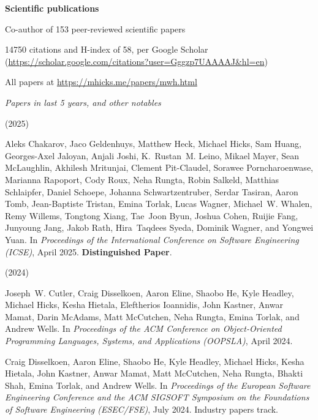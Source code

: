 \documentclass[11pt]{article}
\begin{document}
\begin{description}
\setlength{\labelsep}{0ex}
\setlength{\itemsep}{-0.5ex}


\item {\bf\textsf Scientific publications}

\item Co-author of 153 peer-reviewed scientific papers
\item 14750 citations and H-index of 58, per Google Scholar\\
  (\url{https://scholar.google.com/citations?user=Gggzp7UAAAAJ&hl=en})
 \item All papers at \url{https://mhicks.me/papers/mwh.html}

\item
\item {\it\textsf Papers in last 5 years, and other notables}
\item (2025)

\item
Aleks Chakarov, Jaco Geldenhuys, Matthew Heck, Michael Hicks, Sam Huang,
  Georges-Axel Jaloyan, Anjali Joshi, K.~Rustan~M. Leino, Mikael Mayer, Sean
  McLaughlin, Akhilesh Mritunjai, Clement Pit-Claudel, Sorawee Porncharoenwase,
  Marianna Rapoport, Cody Roux, Neha Rungta, Robin Salkeld, Matthias
  Schlaipfer, Daniel Schoepe, Johanna Schwartzentruber, Serdar Tasiran, Aaron
  Tomb, Jean-Baptiste Tristan, Emina Torlak, Lucas Wagner, Michael~W. Whalen,
  Remy Willems, Tongtong Xiang, Tae~Joon Byun, Joshua Cohen, Ruijie Fang,
  Junyoung Jang, Jakob Rath, Hira~Taqdees Syeda, Dominik Wagner, and Yongwei
  Yuan.
In {\em Proceedings of the International Conference on Software
  Engineering (ICSE)}, April 2025. \textbf{Distinguished Paper}.

\item
\item (2024)

\item Joseph~W. Cutler, Craig Disselkoen, Aaron Eline, Shaobo He, Kyle Headley,
  Michael Hicks, Kesha Hietala, Eleftherios Ioannidis, John Kastner, Anwar
  Mamat, Darin McAdams, Matt McCutchen, Neha Rungta, Emina Torlak, and Andrew
  Wells.
In {\em Proceedings of the {ACM} Conference on Object-Oriented
  Programming Languages, Systems, and Applications (OOPSLA)}, April 2024.
  
\item Craig Disselkoen, Aaron Eline, Shaobo He, Kyle Headley, Michael Hicks, Kesha
  Hietala, John Kastner, Anwar Mamat, Matt McCutchen, Neha Rungta, Bhakti Shah,
  Emina Torlak, and Andrew Wells.
In {\em Proceedings of the European Software Engineering Conference
  and the ACM SIGSOFT Symposium on the Foundations of Software Engineering
  (ESEC/FSE)}, July 2024.
Industry papers track.


\end{description}
\end{document}
